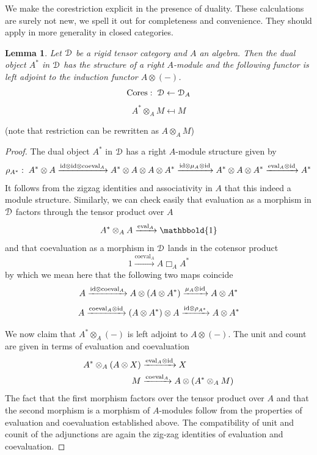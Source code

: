 \documentclass[a4paper, reqno]{amsart}
\newtheorem{lemma}[theorem]{Lemma}
\theoremstyle{introTheorems}
\newcommand\id{\textup{id}}
\renewcommand{\1}{\mathbbold{1}}
\begin{document}
We make the corestriction explicit in the presence of duality.  These calculations are surely not new, we spell it out for completeness and convenience. They should apply in more generality in closed categories. 
\begin{lemma} 
Let $\mathcal{D}$ be a rigid tensor category and $A$ an   algebra. Then the dual object $A^*$ in $\mathcal{D}$ has the structure of a right $A$-module and the following functor is left adjoint to the induction functor $A\otimes(-)$.
$$\mathrm{Cores}:\; \mathcal{D}\leftarrow \mathcal{D}_A$$
$$A^*\otimes_A M \mapsfrom M$$
\end{lemma}
(note that restriction can be rewritten as  $A\otimes_A M$)
\begin{proof}

The dual object $A^*$ in $\mathcal{D}$ has a right $A$-module structure given by 
$$\rho_{A^*}:\;A^*\otimes A
\xrightarrow{\id\otimes \id \otimes \mathrm{coeval}_A}
A^*\otimes A \otimes A\otimes A^*
\xrightarrow{\id\otimes \mu_A \otimes \id}
A^*\otimes A\otimes A^*
\xrightarrow{\mathrm{eval}_A\otimes \id}
A^*
$$
It follows from the zigzag identities and associativity in $A$ that this indeed a module structure. Similarly, we can check easily that evaluation as a morphism in $\mathcal{D}$ factors through the tensor product over $A$
$$A^*\otimes_A A\xrightarrow{\mathrm{eval}_A} \1 $$
and that coevaluation as a morphism in $\mathcal{D}$  
lands in the cotensor product
$$1 \xrightarrow{\mathrm{coeval}_A} A\Box_A A^* $$
by which we mean here that the following two maps coincide
$$A \xrightarrow{\id\otimes \mathrm{coeval}_A} A\otimes (A\otimes A^*) 
\xrightarrow{\mu_A\otimes \id} A\otimes A^*$$
$$A \xrightarrow{\mathrm{coeval}_A\otimes \id}  (A\otimes A^*) \otimes A
\xrightarrow{\id\otimes \rho_{A^*}} A\otimes A^*$$

\bigskip


We now claim that $A^*\otimes_A(-)$ is left adjoint to $A\otimes(-)$. The unit and count are given in terms of evaluation and coevaluation
\begin{align*}
A^*\otimes_A (A \otimes X)
&\xrightarrow{\mathrm{eval}_A\otimes \id} X \\
M
&\xrightarrow{\mathrm{coeval}_A} A\otimes (A^*\otimes_A M) 
\end{align*}
The fact that the first morphism factors over the tensor product over $A$ and that the second morphism is a morphism of $A$-modules follow from the properties of evaluation and coevaluation established above.  
The compatibility of unit and counit of the adjunctions are again the zig-zag identities of evaluation and coevaluation. 

\end{proof}
\end{document}

